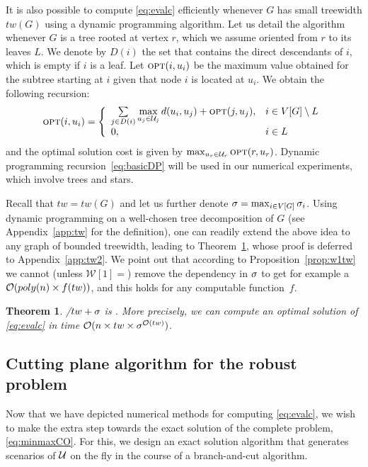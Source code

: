 \documentclass[12pt]{article}
\newtheorem{theorem}{Theorem}
\begin{document}
It is also possible to compute \ref{eq:evalc} efficiently whenever $G$ has small treewidth $tw(G)$ using a dynamic programming algorithm. Let us detail the algorithm whenever $G$ is a tree rooted at vertex $r$, which we assume oriented from $r$ to its leaves $L$. We denote by $D(i)$ the set that contains the direct descendants of $i$, which is empty if $i$ is a leaf. Let $\mbox{\textsc{opt}}(i,u_i)$ be the maximum value obtained for the subtree starting at $i$ given that node $i$ is located at $u_i$. We obtain the following recursion:
\begin{equation}
 \label{eq:basicDP}
\mbox{\textsc{opt}}(i,u_i) = \left\{
\begin{array}{ll}
\sum\limits_{j \in D(i)} \max\limits_{u_j \in \mathcal{U}_j} d(u_i,u_j) + \mbox{\textsc{opt}}(j,u_j), & i\in V[G]\setminus L \\
0, & i \in L
\end{array}
\right.
\end{equation}
and the optimal solution cost is given by $\max_{u_r\in\mathcal{U}_r}\mbox{\textsc{opt}}(r,u_r)$. Dynamic programming recursion~\eqref{eq:basicDP} will be used in our numerical experiments, which involve trees and stars.

Recall that $tw = tw(G)$ and let us further denote $\sigma=\max_{i \in V[G]}{\sigma_{i}}$. Using dynamic programming on a well-chosen tree decomposition of $G$ (see Appendix~\ref{app:tw} for the definition), one can readily extend the above idea to any graph of bounded treewidth, leading to Theorem~\ref{thm:tw}, whose proof is deferred to Appendix~\ref{app:tw2}. We point out that according to Proposition~\ref{prop:w1tw} we cannot (unless $\mathcal{W}[1]=$\FPT) remove the dependency in $\sigma$ to get for example a $\mathcal{O}(poly(n) \times f(tw))$, and this holds for any computable function~$f$.

\begin{theorem}\label{thm:tw}
  \EVALC/$tw+\sigma$ is \FPT. More precisely, we can compute an optimal solution of \ref{eq:evalc} in time $\mathcal{O}(n \times tw \times \sigma^{\mathcal{O}(tw)})$.
\end{theorem}


\subsection{Cutting plane algorithm for the robust problem}
\label{sec:CProbustPi}

Now that we have depicted numerical methods for computing \ref{eq:evalc}, we wish to make the extra step towards the exact solution of the complete problem, \ref{eq:minmaxCO}.
For this, we design an exact solution algorithm that generates scenarios of $\mathcal{U}$ on the fly in the course of a branch-and-cut algorithm. 
\end{document}

